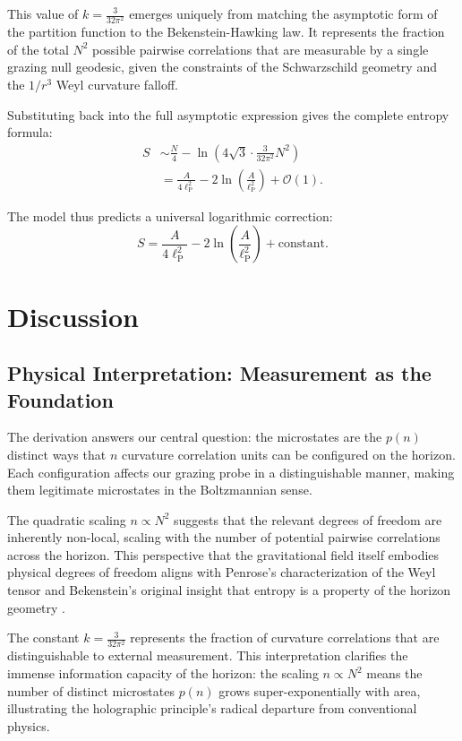 \documentclass[12pt, letterpaper]{article}
\newcommand{\ellp}{\ell_{\mathrm{P}}}
\begin{document}
This value of $k = \frac{3}{32\pi^2}$ emerges uniquely from matching the asymptotic form of the partition function to the Bekenstein-Hawking law. It represents the fraction of the total $N^2$ possible pairwise correlations that are measurable by a single grazing null geodesic, given the constraints of the Schwarzschild geometry and the $1/r^3$ Weyl curvature falloff.

Substituting back into the full asymptotic expression gives the complete entropy formula:
\begin{align}
S &\sim \frac{N}{4} - \ln\left(4 \sqrt{3} \cdot \frac{3}{32\pi^2} N^2 \right) \nonumber \\
&= \frac{A}{4\ellp^2} - 2 \ln\left( \frac{A}{\ellp^2} \right) + \mathcal{O}(1). \label{eq:entropy_corrected}
\end{align}

The model thus predicts a universal logarithmic correction:
\begin{equation}\label{eq:final_entropy}
S = \frac{A}{4\ellp^2} - 2 \ln\left( \frac{A}{\ellp^2} \right) + \text{constant}.
\end{equation}

\section{Discussion}

\subsection{Physical Interpretation: Measurement as the Foundation}

The derivation answers our central question: the microstates are the $p(n)$ distinct ways that $n$ curvature correlation units can be configured on the horizon. Each configuration affects our grazing probe in a distinguishable manner, making them legitimate microstates in the Boltzmannian sense.

The quadratic scaling $n \propto N^2$ suggests that the relevant degrees of freedom are inherently non-local, scaling with the number of potential pairwise correlations across the horizon. This perspective that the gravitational field itself embodies physical degrees of freedom aligns with Penrose's characterization of the Weyl tensor \cite{Penrose2004} and Bekenstein's original insight that entropy is a property of the horizon geometry \cite{Bekenstein1972}.

The constant $k = \frac{3}{32\pi^2}$ represents the fraction of curvature correlations that are distinguishable to external measurement. This interpretation clarifies the immense information capacity of the horizon: the scaling $n \propto N^2$ means the number of distinct microstates $p(n)$ grows super-exponentially with area, illustrating the holographic principle's radical departure from conventional physics.
\end{document}
